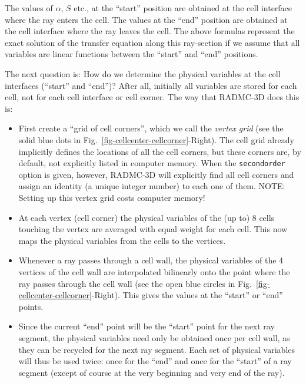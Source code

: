\documentclass{report}
\begin{document}
The values of $\alpha$, $S$ etc., at the ``start'' position are obtained at
the cell interface where the ray enters the cell. The values at the ``end''
position are obtained at the cell interface where the ray leaves the cell.
The above formulas represent the exact solution of the transfer equation
along this ray-section if we assume that all variables are linear functions
between the ``start'' and ``end'' positions. 

The next question is: How do we determine the physical variables at the
cell interfaces (``start'' and ``end'')? After all, initially all variables
are stored for each cell, not for each cell interface or cell corner. The
way that RADMC-3D does this is:
\begin{itemize}
\item First create a ``grid of cell corners'', which we call the {\em vertex
    grid} (see the solid blue dots in
  Fig.~\ref{fig-cellcenter-cellcorner}-Right). The cell grid already
  implicitly defines the locations of all the cell corners, but these
  corners are, by default, not explicitly listed in computer memory. When
  the {\small\tt secondorder} option is given, however, RADMC-3D will
  explicitly find all cell corners and assign an identity (a unique integer
  number) to each one of them. NOTE: Setting up this vertex grid costs
  computer memory!
\item At each vertex (cell corner) the physical variables of the (up to) 8
  cells touching the vertex are averaged with equal weight for each cell.
  This now maps the physical variables from the cells to the vertices.
\item Whenever a ray passes through a cell wall, the physical variables of
  the 4 vertices of the cell wall are interpolated bilinearly onto the point
  where the ray passes through the cell wall (see the open blue circles in
  Fig.~\ref{fig-cellcenter-cellcorner}-Right). This gives the values at the
  ``start'' or ``end'' points. 
\item Since the current ``end'' point will be the ``start'' point for the
  next ray segment, the physical variables need only be obtained once per
  cell wall, as they can be recycled for the next ray segment. Each set of
  physical variables will thus be used twice: once for the ``end'' and once
  for the ``start'' of a ray segment (except of course at the very beginning
  and very end of the ray). 
\end{itemize}
\end{document}
